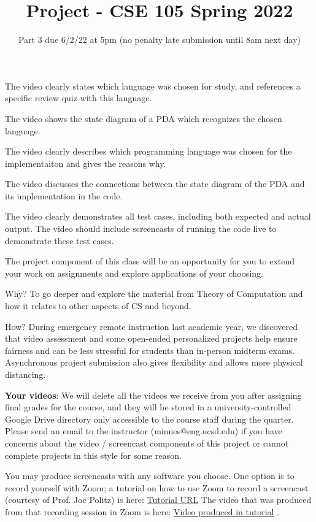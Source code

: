 The video clearly states which language was chosen for study, 
and references a specific review quiz with this language.

The video shows the state diagram of a PDA which recognizes the 
chosen language.

The video clearly describes which programming language was chosen 
for the implementaiton and gives the reasons why.

The video discusses the connections between the state diagram of the PDA 
and its implementation in the code.

The video clearly demonstrates all test cases, including both expected
and actual output. The video should include screencasts of 
running the code live to demonstrate these test cases.

\newpage

\title{Project - CSE 105 Spring 2022}
\date{Part 3 due 6/2/22 at 5pm (no penalty late submission until 8am next day)}


\maketitle
\thispagestyle{fancy}

\vspace{-30pt}

 The project component of this class will be an opportunity for you to extend your work on 
 assignments and explore applications of your choosing. 
 
 Why?  To go deeper and explore the material from Theory of Computation and how it relates to 
 other aspects of CS and beyond. 
 
 How?  During emergency remote instruction last academic year, we discovered that video 
 assessment and some open-ended personalized projects help ensure fairness and can be less 
 stressful for students than in-person midterm exams. Asynchronous project submission also 
 gives flexibility and allows more physical distancing. 
 
 {\bf Your videos}: We will delete all the videos we receive from you after assigning final grades for 
 the course, and they will be stored in a university-controlled Google Drive directory only 
 accessible to the course staff during the quarter. Please send an email to the instructor 
 (minnes@eng.ucsd.edu) if you have concerns about the video / screencast components of this 
 project or cannot complete projects in this style for some reason. 
 
 You may produce screencasts with any software you choose. One option is to record yourself 
 with Zoom; a tutorial on how to use Zoom to record a screencast (courtesy of Prof. Joe Politz) is 
 here: \href{https://drive.google.com/open?id=1KROMAQuTCk40zwrEFotlYSJJQdcG_GUU}{Tutorial URL}
 The video that was produced from that recording session in Zoom is here:
 \href{{https://drive.google.com/open?id=1MxJN6CQcXqIbOekDYMxjh7mTt1TyRVMl}}{Video produced in tutorial} .
 

